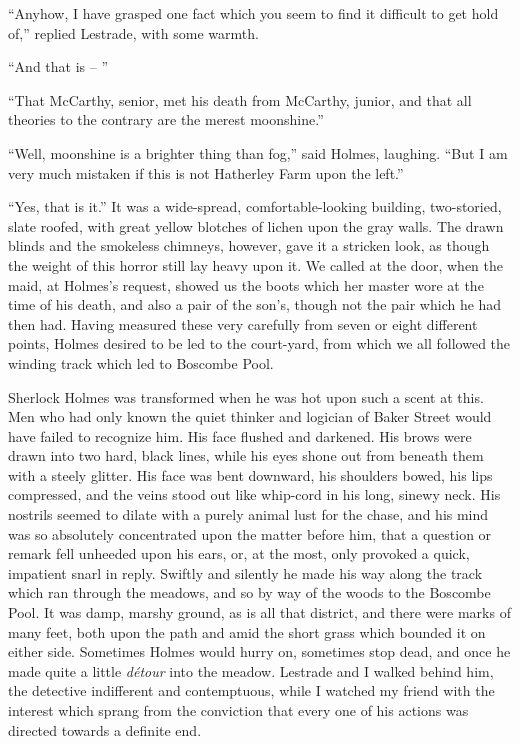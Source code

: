 “Anyhow, I have grasped one fact which you seem to find it
difficult to get hold of,” replied Lestrade, with some warmth.

“And that is -- ”

“That McCarthy, senior, met his death from McCarthy,
junior, and that all theories to the contrary are the merest
moonshine.”

“Well, moonshine is a brighter thing than fog,” said
Holmes, laughing. “But I am very much mistaken if this
is not Hatherley Farm upon the left.”

“Yes, that is it.” It was a wide-spread, com\-fortable-looking
building, two-storied, slate roofed, with great yellow blotches of
lichen upon the gray walls. The drawn blinds and the smokeless
chimneys, however, gave it a stricken look, as though the
weight of this horror still lay heavy upon it. We called at the
door, when the maid, at Holmes’s request, showed us the boots
which her master wore at the time of his death, and also a
pair of the son’s, though not the pair which he had then had.
Having measured these very carefully from seven or eight
different points, Holmes desired to be led to the court-yard,
from which we all followed the winding track which led to
Boscombe Pool.

Sherlock Holmes was transformed when he was hot upon
such a scent at this. Men who had only known the quiet
thinker and logician of Baker Street would have failed to
recognize him. His face flushed and darkened. His brows
were drawn into two hard, black lines, while his eyes shone
out from beneath them with a steely glitter. His face was
bent downward, his shoulders bowed, his lips compressed,
and the veins stood out like whip-cord in his long, sinewy
neck. His nostrils seemed to dilate with a purely animal lust
for the chase, and his mind was so absolutely concentrated
upon the matter before him, that a question or remark fell unheeded
upon his ears, or, at the most, only provoked a quick,
impatient snarl in reply. Swiftly and silently he made his
way along the track which ran through the meadows, and so
by way of the woods to the Boscombe Pool. It was damp,
marshy ground, as is all that district, and there were marks
of many feet, both upon the path and amid the short grass
which bounded it on either side. Sometimes Holmes would
hurry on, sometimes stop dead, and once he made quite a little
\textit{détour} into the meadow. Lestrade and I walked behind
him, the detective indifferent and contemptuous, while I
watched my friend with the interest which sprang from the
conviction that every one of his actions was directed towards
a definite end.

